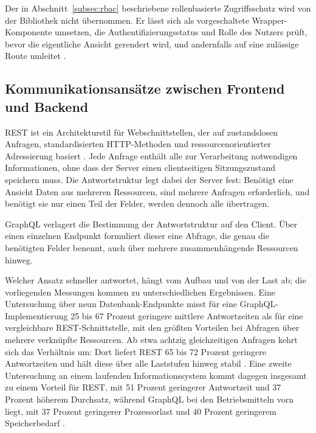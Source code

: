Der in Abschnitt~\ref{subsec:rbac} beschriebene rollenbasierte
Zugriffsschutz wird von der Bibliothek nicht übernommen. Er lässt
sich als vorgeschaltete Wrapper-Komponente umsetzen, die
Authentifizierungsstatus und Rolle des Nutzers prüft, bevor die
eigentliche Ansicht gerendert wird, und andernfalls auf eine
zulässige Route umleitet \cite{wieruch_protected_routes}.


\subsection{Kommunikationsansätze zwischen Frontend und Backend}
\label{subsec:rest-api}

\acs{REST} ist ein Architekturstil für Webschnittstellen, der auf
zustandslosen Anfragen, standardisierten \acs{HTTP}-Methoden und
ressourcenorientierter Adressierung basiert \cite{fielding_rest}.
Jede Anfrage enthält alle zur Verarbeitung notwendigen
Informationen, ohne dass der Server einen clientseitigen
Sitzungszustand speichern muss. Die Antwortstruktur legt dabei der
Server fest: Benötigt eine Ansicht Daten aus mehreren Ressourcen,
sind mehrere Anfragen erforderlich, und benötigt sie nur einen Teil
der Felder, werden dennoch alle übertragen.

GraphQL verlagert die Bestimmung der Antwortstruktur auf den
Client. Über einen einzelnen Endpunkt formuliert dieser eine
Abfrage, die genau die benötigten Felder benennt, auch über mehrere
zusammenhängende Ressourcen hinweg.

Welcher Ansatz schneller antwortet, hängt vom Aufbau und von der
Last ab; die vorliegenden Messungen kommen zu unterschiedlichen
Ergebnissen. Eine Untersuchung über neun Datenbank-Endpunkte misst
für eine GraphQL-Implementierung 25 bis 67 Prozent geringere
mittlere Antwortzeiten als für eine vergleichbare
\acs{REST}-Schnittstelle, mit den größten Vorteilen bei Abfragen
über mehrere verknüpfte Ressourcen. Ab etwa achtzig gleichzeitigen
Anfragen kehrt sich das Verhältnis um: Dort liefert \acs{REST} 65
bis 72 Prozent geringere Antwortzeiten und hält diese über alle
Laststufen hinweg stabil \cite{lloyd_graphql_rest}. Eine zweite
Untersuchung an einem laufenden Informationssystem kommt dagegen
insgesamt zu einem Vorteil für \acs{REST}, mit 51 Prozent
geringerer Antwortzeit und 37 Prozent höherem Durchsatz, während
GraphQL bei den Betriebsmitteln vorn liegt, mit 37 Prozent
geringerer Prozessorlast und 40 Prozent geringerem Speicherbedarf
\cite{lawi_graphql_rest}.

